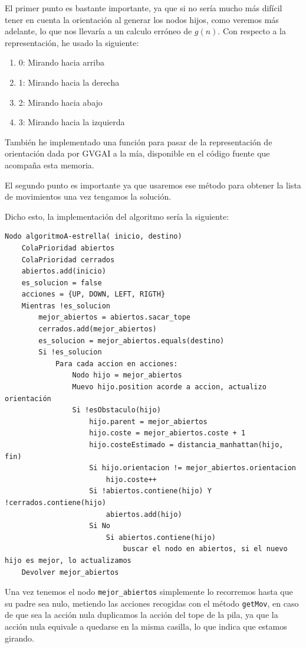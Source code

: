 \documentclass[10pt, spanish]{article}
\begin{document}
El primer punto es bastante importante, ya que si no sería mucho más difícil tener en cuenta la orientación al generar los nodos hijos, como veremos más adelante, lo que nos llevaría a un calculo erróneo de $g(n)$. Con respecto a la representación, he usado la siguiente:

\begin{enumerate}
	\item 0: Mirando hacia arriba
	\item 1: Mirando hacia la derecha
	\item 2: Mirando hacia abajo
	\item 3: Mirando hacia la izquierda
\end{enumerate}

También he implementado una función para pasar de la representación de orientación dada por GVGAI a la mía, disponible en el código fuente que acompaña esta memoria.

El segundo punto es importante ya que usaremos ese método para obtener la lista de movimientos una vez tengamos la solución.

Dicho esto, la implementación del algoritmo sería la siguiente:

\begin{lstlisting}
Nodo algoritmoA-estrella( inicio, destino)
	ColaPrioridad abiertos
	ColaPrioridad cerrados
	abiertos.add(inicio)
	es_solucion = false
	acciones = {UP, DOWN, LEFT, RIGTH}
	Mientras !es_solucion
		mejor_abiertos = abiertos.sacar_tope
		cerrados.add(mejor_abiertos)
		es_solucion = mejor_abiertos.equals(destino)
		Si !es_solucion
			Para cada accion en acciones:
				Nodo hijo = mejor_abiertos
				Muevo hijo.position acorde a accion, actualizo orientación
				Si !esObstaculo(hijo)
					hijo.parent = mejor_abiertos
					hijo.coste = mejor_abiertos.coste + 1
					hijo.costeEstimado = distancia_manhattan(hijo, fin)
					Si hijo.orientacion != mejor_abiertos.orientacion
						hijo.coste++
					Si !abiertos.contiene(hijo) Y !cerrados.contiene(hijo)
						abiertos.add(hijo)
					Si No
						Si abiertos.contiene(hijo)
							buscar el nodo en abiertos, si el nuevo hijo es mejor, lo actualizamos
	Devolver mejor_abiertos
\end{lstlisting}

Una vez tenemos el nodo \texttt{mejor\_abiertos} simplemente lo recorremos hasta que su padre sea nulo, metiendo las acciones recogidas con el método \texttt{getMov}, en caso de que sea la acción nula duplicamos la acción del tope de la pila, ya que la acción nula equivale a quedarse en la misma casilla, lo que indica que estamos girando.
\end{document}
